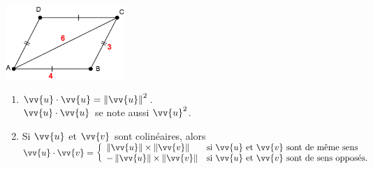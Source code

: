 \documentclass[a4paper,11pt,cours]{nsi} %
\begin{document}
\begin{exemple}[ 4]
    {\includegraphics[width=4.5cm]{exemple4.png}}
\end{exemple}

\begin{remarque}
    \begin{enumerate}[label=\textbullet]
        \item $\vv{u} \cdot \vv{u} = \left\|\vv{u}\right\|^2$.\\
        $\vv{u} \cdot \vv{u}$ se note aussi $\vv{u}^2$.
        \item Si $\vv{u}$ et $\vv{v}$ sont colinéaires, alors \\[.5em]
            $\vv{u} \cdot \vv{v}=\left\{\begin{array}{ll}
			\left\| \vv{u}\right\|\times \left\|\vv{v}\right\| & \text{si } \vv{u} \text{ et } \vv{v} \text{ sont de même sens} \\
			-\left\| \vv{u}\right\|\times \left\|\vv{v}\right\| & \text{si } \vv{u} \text{ et } \vv{v} \text{ sont de sens opposés.} \\
		\end{array}
		\right.$ 
    \end{enumerate}
\end{remarque}
\end{document}
